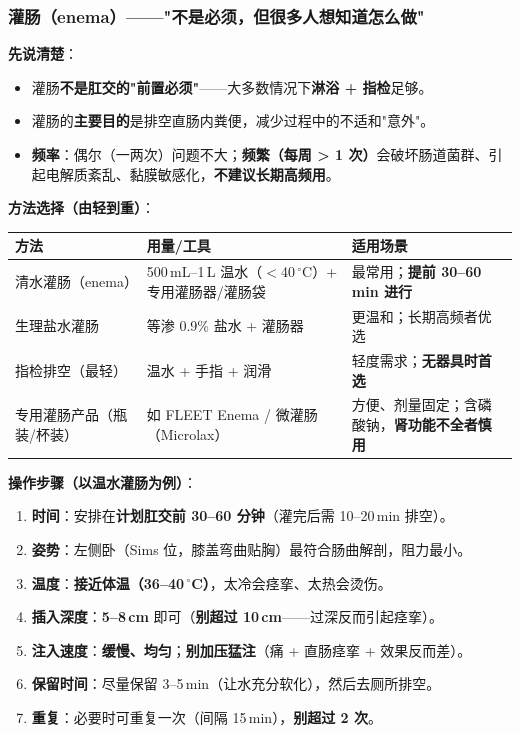 \documentclass[12pt,UTF8,openany]{ctexbook}
\begin{document}
\subsubsection*{灌肠（enema）——"不是必须，但很多人想知道怎么做"}

\textbf{先说清楚}：
\begin{itemize}[leftmargin=2em,itemsep=0.3em]
  \item 灌肠\textbf{不是肛交的"前置必须"}——大多数情况下\textbf{淋浴 + 指检}足够。
  \item 灌肠的\textbf{主要目的}是排空直肠内粪便，减少过程中的不适和"意外"。
  \item \textbf{频率}：偶尔（一两次）问题不大；\textbf{频繁（每周 > 1 次）}会破坏肠道菌群、引起电解质紊乱、黏膜敏感化，\textbf{不建议长期高频用}。
\end{itemize}

\noindent\textbf{方法选择（由轻到重）}：
\begin{center}
\footnotesize
\begin{tabularx}{\textwidth}{l X X}
\toprule
\textbf{方法} & \textbf{用量/工具} & \textbf{适用场景} \\
\midrule
清水灌肠（enema） & 500\,mL--1\,L 温水（$<$40\,$^\circ$C）+ 专用灌肠器/灌肠袋 & 最常用；\textbf{提前 30--60\,min 进行} \\
生理盐水灌肠 & 等渗 0.9\% 盐水 + 灌肠器 & 更温和；长期高频者优选 \\
指检排空（最轻） & 温水 + 手指 + 润滑 & 轻度需求；\textbf{无器具时首选} \\
专用灌肠产品（瓶装/杯装） & 如 FLEET Enema / 微灌肠（Microlax） & 方便、剂量固定；含磷酸钠，\textbf{肾功能不全者慎用} \\
\bottomrule
\end{tabularx}
\end{center}

\noindent\textbf{操作步骤（以温水灌肠为例）}：
\begin{enumerate}[leftmargin=2em,itemsep=0.2em]
  \item \textbf{时间}：安排在\textbf{计划肛交前 30--60 分钟}（灌完后需 10--20\,min 排空）。
  \item \textbf{姿势}：左侧卧（Sims 位，膝盖弯曲贴胸）最符合肠曲解剖，阻力最小。
  \item \textbf{温度}：\textbf{接近体温（36--40\,$^\circ$C）}，太冷会痉挛、太热会烫伤。
  \item \textbf{插入深度}：\textbf{5--8\,cm} 即可（\textbf{别超过 10\,cm}——过深反而引起痉挛）。
  \item \textbf{注入速度}：\textbf{缓慢、均匀}；\textbf{别加压猛注}（痛 + 直肠痉挛 + 效果反而差）。
  \item \textbf{保留时间}：尽量保留 3--5\,min（让水充分软化），然后去厕所排空。
  \item \textbf{重复}：必要时可重复一次（间隔 15\,min），\textbf{别超过 2 次}。
\end{enumerate}
\end{document}
